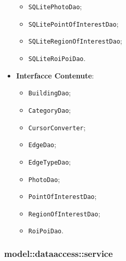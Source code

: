\documentclass[../DefinizioneDiProdotto.tex]{subfiles}
\begin{document}
\begin{itemize}
\begin{itemize}
		\item \texttt{SQLitePhotoDao};
		
		\item \texttt{SQLitePointOfInterestDao};
		
		\item \texttt{SQLiteRegionOfInterestDao};
		
		\item \texttt{SQLiteRoiPoiDao}.
		
	\end{itemize}
	\item \textbf{Interfacce Contenute}:
	\begin{itemize}
		\item \texttt{BuildingDao};
		
		\item \texttt{CategoryDao};
		
		\item \texttt{CursorConverter};
		
		\item \texttt{EdgeDao};
		
		\item \texttt{EdgeTypeDao};
		
		\item \texttt{PhotoDao};
		
		\item \texttt{PointOfInterestDao};
		
		\item \texttt{RegionOfInterestDao};
		
		\item \texttt{RoiPoiDao}.
		
	\end{itemize}
\end{itemize}

\subsubsection{model::\-dataaccess::\-service}
\end{document}
